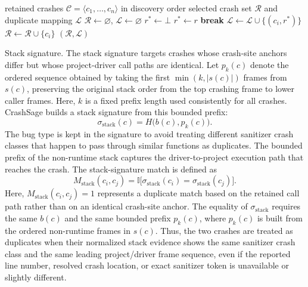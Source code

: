 \documentclass[pdflatex,sn-basic]{sn-jnl}%
\theoremstyle{thmstyleone}%
\theoremstyle{thmstyletwo}%
\theoremstyle{thmstylethree}%
\begin{document}
\begin{algorithm}[!htbp]
\caption{Representative Selection}
\label{alg:representative-selection}
\begin{algorithmic}
\Require retained crashes \(\mathcal{C}=\langle c_1,\ldots,c_n\rangle\) in discovery order
\Ensure selected crash set \(\mathcal{R}\) and duplicate mapping \(\mathcal{L}\)
\State \(\mathcal{R}\gets\varnothing\), \(\mathcal{L}\gets\varnothing\)
    \State \(r^\ast\gets\bot\)
            \State \(r^\ast\gets r\)
            \State \textbf{break}
        \EndIf
    \EndFor
        \State \(\mathcal{L}\gets\mathcal{L}\cup\{(c_i,r^\ast)\}\)
    \Else
        \State \(\mathcal{R}\gets\mathcal{R}\cup\{c_i\}\)
    \EndIf
\EndFor
\State \Return \((\mathcal{R},\mathcal{L})\)
\end{algorithmic}
\end{algorithm}

Stack signature. The stack signature targets crashes whose crash-site anchors differ but whose project-driver call paths are identical.
Let \(p_k(c)\) denote the ordered sequence obtained by taking the first \(\min(k,|s(c)|)\) frames from \(s(c)\), preserving the original stack order from the top crashing frame to lower caller frames.
Here, \(k\) is a fixed prefix length used consistently for all crashes.
CrashSage builds a stack signature from this bounded prefix:
\begin{equation*}
\sigma_{\mathrm{stack}}(c)=H\bigl(b(c),p_k(c)\bigr).
\end{equation*}
The bug type is kept in the signature to avoid treating different sanitizer crash classes that happen to pass through similar functions as duplicates.
The bounded prefix of the non-runtime stack captures the driver-to-project execution path that reaches the crash.
The stack-signature match is defined as
\begin{equation*}
M_{\mathrm{stack}}(c_i,c_j)=
\mathbb{I}\bigl[
\sigma_{\mathrm{stack}}(c_i)=\sigma_{\mathrm{stack}}(c_j)
\bigr].
\end{equation*}
Here, \(M_{\mathrm{stack}}(c_i,c_j)=1\) represents a duplicate match based on the retained call path rather than on an identical crash-site anchor.
The equality of \(\sigma_{\mathrm{stack}}\) requires the same \(b(c)\) and the same bounded prefix \(p_k(c)\), where \(p_k(c)\) is built from the ordered non-runtime frames in \(s(c)\).
Thus, the two crashes are treated as duplicates when their normalized stack evidence shows the same sanitizer crash class and the same leading project/driver frame sequence, even if the reported line number, resolved crash location, or exact sanitizer token is unavailable or slightly different.
\end{document}
